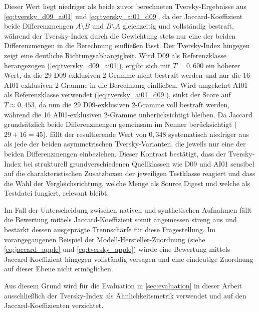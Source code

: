 Dieser Wert liegt niedriger als beide zuvor berechneten Tversky-Ergebnisse aus \cref{eq:tversky_d09_ai01} und \cref{eq:tversky_ai01_d09}, da der Jaccard-Koeffizient beide Differenzmengen \(A \setminus B\) und \(B \setminus A\) gleichzeitig und vollständig bestraft, während der Tversky-Index durch die Gewichtung stets nur eine der beiden Differenzmengen in die Berechnung einfließen lässt. Der Tversky-Index hingegen zeigt eine deutliche Richtungsabhängigkeit. Wird D09 als Referenzklasse herangezogen (\cref{eq:tversky_d09_ai01}), ergibt sich mit \(T = 0{,}600\) ein höherer Wert, da die 29 D09-exklusiven 2-Gramme nicht bestraft werden und nur die 16 AI01-exklusiven 2-Gramme in die Berechnung einfließen. Wird umgekehrt AI01 als Referenzklasse verwendet (\cref{eq:tversky_ai01_d09}), sinkt der Score auf \(T \approx 0{,}453\), da nun die 29 D09-exklusiven 2-Gramme voll bestraft werden, während die 16 AI01-exklusiven 2-Gramme unberücksichtigt bleiben. Da Jaccard grundsätzlich beide Differenzmengen gemeinsam im Nenner berücksichtigt (\(29 + 16 = 45\)), fällt der resultierende Wert von \(0{,}348\) systematisch niedriger aus als jede der beiden asymmetrischen Tversky-Varianten, die jeweils nur eine der beiden Differenzmengen einbeziehen. Dieser Kontrast bestätigt, dass der Tversky-Index bei strukturell grundverschiedenen Quellklassen wie D09 und AI01 sensibel auf die charakteristischen Zusatzboxen der jeweiligen Testklasse reagiert und dass die Wahl der Vergleichsrichtung, welche Menge als Source Digest und welche als Testdatei fungiert, relevant bleibt.

Im Fall der Unterscheidung zwischen nativen und synthetischen Aufnahmen fällt die Bewertung mittels Jaccard-Koeffizient somit angemessen streng aus und bestärkt dessen ausgeprägte Trennschärfe für diese Fragestellung. Im vorangegangenen Beispiel der Modell-Hersteller-Zuordnung (siehe \cref{eq:jaccard_apple} und \cref{eq:tversky_apple}) würde eine Bewertung mittels Jaccard-Koeffizient hingegen vollständig versagen und eine eindeutige Zuordnung auf dieser Ebene nicht ermöglichen.

Aus diesem Grund wird für die Evaluation in \cref{sec:evaluation} in dieser Arbeit ausschließlich der Tversky-Index als Ähnlichkeitsmetrik verwendet und auf den Jaccard-Koeffizienten verzichtet.